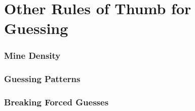 \section{Other Rules of Thumb for Guessing}

\subsubsection*{Mine Density}

\subsubsection*{Guessing Patterns}

\subsubsection*{Breaking Forced Guesses}